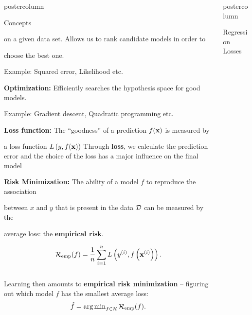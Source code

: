 \documentclass{beamer}
\newlength{\columnheight} %
\begin{document}
\begin{frame}[fragile]{}
\begin{columns}
\begin{column}{.31\textwidth}
\begin{beamercolorbox}[center]{postercolumn}
\begin{minipage}{.98\textwidth}
{\begin{myblock}{Concepts}
						
						    on a given data set. Allows us to rank candidate models in order to
						
						
						    choose the best one.
						
						\hspace*{1ex}Example: Squared error, Likelihood etc.
						
						\vspace*{0.5ex}
						
							 \textbf{Optimization: }Efficiently searches the hypothesis space for good models.
						
						\hspace*{1ex}Example: Gradient descent, Quadratic programming etc.
						
						
							 \textbf{Loss function: }The \enquote{goodness} of a prediction $f(\mathbf{x})$ is measured by
						
						
							 a loss function $L\left(y, f(\mathbf{x})\right)$
						 \hspace*{1ex}Through \textbf{loss}, we calculate the prediction error and the choice of the \hspace*{1ex}loss has a major influence on the final model
						
	             
							 \textbf{Risk Minimization: }The ability of a model $f$ to reproduce the association
						
						
						
							 between $x$ and $y$ that is present in the data $\mathcal{D}$ can be measured by the
						
						
							average loss: the \textbf{empirical risk}.
						
						$$\mathcal{R}_{\text{emp}}(f) = \frac{1}{n} \sum\limits_{i=1}^n L\left(y^{(i)}, f\left(\mathbf{x}^{(i)}\right)\right).$$
						\\
						\hspace*{1ex}Learning then amounts to \textbf{empirical risk minimization} -- figuring out \hspace*{1ex}which model $f$ has the smallest average loss:$$\hat{f} = \operatorname{arg\,min}_{f \in \mathcal{H}} \mathcal{R}_{\text{emp}}(f).$$
						\end{myblock}
				}
			\end{minipage}
		\end{beamercolorbox}
	\end{column}
	\begin{column}{.31\textwidth}
		\begin{beamercolorbox}[center]{postercolumn}
			\begin{minipage}{.98\textwidth}
				\parbox[t][\columnheight]{\textwidth}{
					\begin{myblock}{Regression Losses}
						

\end{myblock}}
\end{minipage}
\end{beamercolorbox}
\end{column}
\end{columns}
\end{frame}
\end{document}
